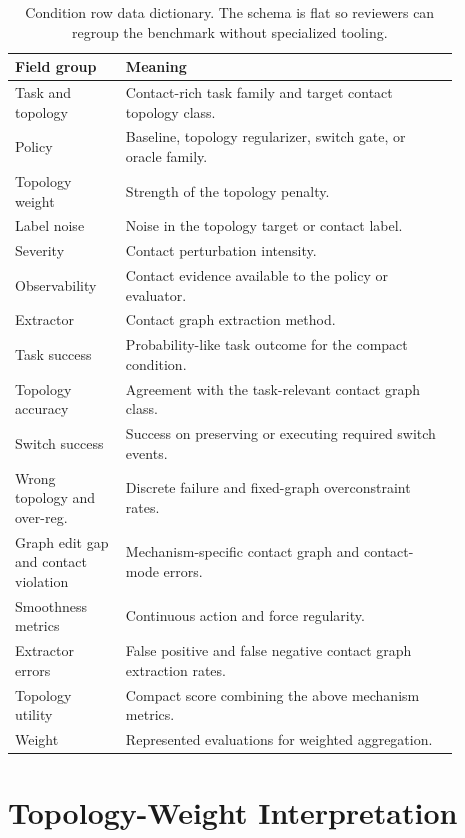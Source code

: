 \documentclass{article}
\begin{document}
\begin{table}[t]
\centering
\small
\begin{tabular}{p{0.22\linewidth}p{0.66\linewidth}}
\toprule
Field group & Meaning \\
\midrule
Task and topology & Contact-rich task family and target contact topology class. \\
Policy & Baseline, topology regularizer, switch gate, or oracle family. \\
Topology weight & Strength of the topology penalty. \\
Label noise & Noise in the topology target or contact label. \\
Severity & Contact perturbation intensity. \\
Observability & Contact evidence available to the policy or evaluator. \\
Extractor & Contact graph extraction method. \\
Task success & Probability-like task outcome for the compact condition. \\
Topology accuracy & Agreement with the task-relevant contact graph class. \\
Switch success & Success on preserving or executing required switch events. \\
Wrong topology and over-reg. & Discrete failure and fixed-graph overconstraint rates. \\
Graph edit gap and contact violation & Mechanism-specific contact graph and contact-mode errors. \\
Smoothness metrics & Continuous action and force regularity. \\
Extractor errors & False positive and false negative contact graph extraction rates. \\
Topology utility & Compact score combining the above mechanism metrics. \\
Weight & Represented evaluations for weighted aggregation. \\
\bottomrule
\end{tabular}
\caption{Condition row data dictionary. The schema is flat so reviewers can regroup the benchmark without specialized tooling.}
\label{tab:data-dictionary}
\end{table}

\section{Topology-Weight Interpretation}
\end{document}
